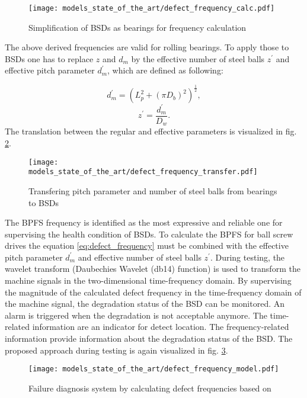 \begin{figure}[H]
  \centering
  \texttt{[image: models\_state\_of\_the\_art/defect\_frequency\_calc.pdf]}
  \caption{Simplification of BSDs as bearings for frequency calculation \cite{Lee2015}}
  \label{fig:defect_frequency_calc}
\end{figure}

The above derived frequencies are valid for rolling bearings. To apply those to BSDs one has to replace $z$ and $d_{m}$ by the effective number of steel balls $z^{'}$ and effective pitch parameter $d_{m}^{'}$, which are defined as following:

\begin{equation}
    d_{m}^{'} = (L_{p}^{2}+(\pi D_{b})^{2})^{\frac{1}{2}},
\end{equation}
\begin{equation}
    z^{'} = \frac{d_{m}^{'}}{D_{w}}.
\end{equation}
The translation between the regular and effective parameters is visualized in fig. \ref{fig:defect_frequency_transfer}. 

\begin{figure}[H]
  \centering
  \texttt{[image: models\_state\_of\_the\_art/defect\_frequency\_transfer.pdf]}
  \caption{Transfering pitch parameter and number of steel balls from bearings to BSDs \cite{Lee2015}}
  \label{fig:defect_frequency_transfer}
\end{figure}

The BPFS frequency is identified as the most expressive and reliable one for supervising the health condition of BSDs. To calculate the BPFS for ball screw drives the equation \ref{eq:defect_frequency} must be combined with the effective pitch parameter $d_{m}^{'}$ and effective number of steel balls $z^{'}$. During testing, the wavelet transform (Daubechies Wavelet (db14) function) is used to transform the machine signals in the two-dimensional time-frequency domain. By supervising the magnitude of the calculated defect frequency in the time-frequency domain of the machine signal, the degradation status of the BSD can be monitored. An alarm is triggered when the degradation is not acceptable anymore. The time-related information are an indicator for detect location. The frequency-related information provide information about the degradation status of the BSD. The proposed approach during testing is again visualized in fig. \ref{fig:defect_frequency_model}. 


\begin{figure}[H]
  \centering
  \texttt{[image: models\_state\_of\_the\_art/defect\_frequency\_model.pdf]}
  \caption{Failure diagnosis system by calculating defect frequencies based on \cite{Lee2015}}
  \label{fig:defect_frequency_model}
\end{figure}

